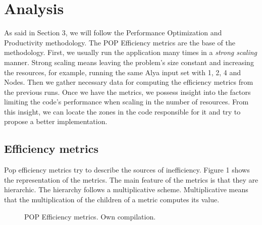 \section{Analysis}\label{sec:popmethod}

As said in Section 3, we will follow the Performance Optimization and Productivity\cite{popMethod} methodology. The POP Efficiency metrics are the base of the methodology. First, we usually run the application many times in a \textit{strong scaling} manner. Strong scaling means leaving the problem's size constant and increasing the resources, for example, running the same Alya input set with 1, 2, 4 and Nodes. Then we gather necessary data for computing the efficiency metrics from the previous runs. Once we have the metrics, we possess insight into the factors limiting the code's performance when scaling in the number of resources. From this insight, we can locate the zones in the code responsible for it and try to propose a better implementation.

\subsection{Efficiency metrics}

Pop efficiency metrics try to describe the sources of inefficiency. Figure 1 shows the representation of the metrics. The main feature of the metrics is that they are hierarchic. The hierarchy follows a multiplicative scheme. Multiplicative means that the multiplication of the children of a metric computes its value.

\begin{figure}[htbp]
\centering
{}
\caption[POP Efficiency metrics.]{POP Efficiency metrics. Own compilation.}
\label{popmet}
\end{figure}

